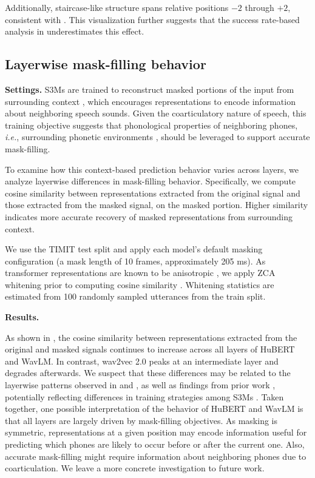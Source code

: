 \documentclass[cameraready]{Interspeech}
\begin{document}
Additionally, staircase-like structure spans relative positions $-2$ through $+2$, consistent with .
This visualization further suggests that the success rate-based analysis in  underestimates this effect.



\subsection{Layerwise mask-filling behavior}\label{ss:reconstruction}
\textbf{Settings.}
S3Ms are trained to reconstruct masked portions of the input from surrounding context \cite{schneider2019wav2vec,baevski2020wav2vec,hsu2021hubert,chen2022wavlm}, which encourages representations to encode information about neighboring speech sounds.
Given the coarticulatory nature of speech, this training objective suggests that phonological properties of neighboring phones, \textit{i.e.}, surrounding phonetic environments \cite{choi2025leveraging}, should be leveraged to support accurate mask-filling.


To examine how this context-based prediction behavior varies across layers, we analyze layerwise differences in mask-filling behavior.
Specifically, we compute cosine similarity between representations extracted from the original signal and those extracted from the masked signal, on the masked portion.
Higher similarity indicates more accurate recovery of masked representations from surrounding context.


We use the TIMIT test split and apply each model's default masking configuration (a mask length of 10 frames, approximately 205 ms).
As transformer representations are known to be anisotropic \cite{ethayarajh2019HowCA}, we apply ZCA whitening prior to computing cosine similarity \cite{krizhevsky2009learning}.
Whitening statistics are estimated from 100 randomly sampled utterances from the train split.



\textbf{Results.}

As shown in , the cosine similarity between representations extracted from the original and masked signals continues to increase across all layers of HuBERT and WavLM.
In contrast, wav2vec 2.0 peaks at an intermediate layer and degrades afterwards.
We suspect that these differences may be related to the layerwise patterns observed in  and , as well as findings from prior work \cite{pasad2021layer,pasad2023comparative}, potentially reflecting differences in training strategies among S3Ms \cite{huo2025iterative}.
Taken together, one possible interpretation of the behavior of HuBERT and WavLM is that all layers are largely driven by mask-filling objectives.
As masking is symmetric, representations at a given position may encode information useful for predicting which phones are likely to occur before or after the current one.
Also, accurate mask-filling might require information about neighboring phones due to coarticulation.
We leave a more concrete investigation to future work.
\end{document}
